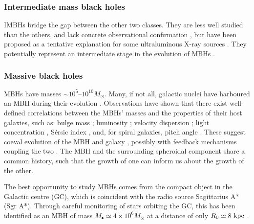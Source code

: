 \subsubsection{Intermediate mass black holes}

IMBHs bridge the gap between the other two classes. They are less well studied than the others, and lack concrete observational confirmation \citep{Miller2009a}, but have been proposed as a tentative explanation for some ultraluminous X-ray sources \citep{Feng2011}. They potentially represent an intermediate stage in the evolution of MBHs \citep{Graham2013}.

\subsubsection{Massive black holes}

MBHs have masses $\sim10^5$--$10^{10} M_\odot$. Many, if not all, galactic nuclei have harboured an MBH during their evolution \citep{Lynden-Bell1971, Soltan1982, Rees1984}. Observations have shown that there exist well-defined correlations between the MBHs' masses and the properties of their host galaxies, such as: bulge mass \citep{Kormendy1995,Haring2004,Graham2012a}; luminosity \citep{Magorrian1998,Marconi2003,Graham2013}; velocity dispersion \citep{Ferrarese2000,Gebhardt2000,Tremaine2002,Graham2011}; light concentration \citep{Graham2001}, S{\'e}rsic index \citep{Graham2007a,Savorgnan2013}, and, for spiral galaxies, pitch angle \citep{Seigar2008,Berrier2013}. These suggest coeval evolution of the MBH and galaxy \citep{Peng2007, Jahnke2011}, possibly with feedback mechanisms coupling the two \citep{Haiman2004, Volonteri2009}. The MBH and the surrounding spheroidal component share a common history, such that the growth of one can inform us about the growth of the other.

The best opportunity to study MBHs comes from the compact object in the Galactic centre (GC), which is coincident with the radio source Sagittarius A* (Sgr A*). Through careful monitoring of stars orbiting the GC, this has been identified as an MBH of mass $M_\bullet \simeq 4 \times 10^6 M_\odot$ at a distance of only $R_0 \simeq 8~\mathrm{kpc}$ \citep{Gillessen2009, Meyer2012}.

